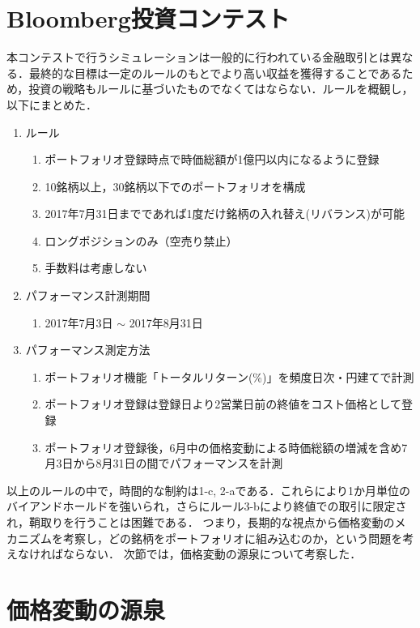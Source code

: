 ﻿\documentclass[11pt]{jreport}
\begin{document}
\section{Bloomberg投資コンテスト}
本コンテストで行うシミュレーションは一般的に行われている金融取引とは異なる．最終的な目標は一定のルールのもとでより高い収益を獲得することであるため，投資の戦略もルールに基づいたものでなくてはならない．ルールを概観し，以下にまとめた．

\begin{enumerate}
\item ルール
\begin{enumerate}
\item ポートフォリオ登録時点で時価総額が1億円以内になるように登録
\item 10銘柄以上，30銘柄以下でのポートフォリオを構成
\item 2017年7月31日までであれば1度だけ銘柄の入れ替え(リバランス)が可能
\item ロングポジションのみ（空売り禁止）
\item 手数料は考慮しない
\end{enumerate}

\item パフォーマンス計測期間
\begin{enumerate}
\item  2017年7月3日 $\sim$ 2017年8月31日
\end{enumerate}

\item パフォーマンス測定方法
\begin{enumerate}
\item ポートフォリオ機能「トータルリターン(\%)」を頻度日次・円建てで計測
\item ポートフォリオ登録は登録日より2営業日前の終値をコスト価格として登録
\item ポートフォリオ登録後，6月中の価格変動による時価総額の増減を含め7月3日から8月31日の間でパフォーマンスを計測
\end{enumerate}
\end{enumerate}

以上のルールの中で，時間的な制約は1-c, 2-aである．これらにより1か月単位のバイアンドホールドを強いられ，さらにルール3-bにより終値での取引に限定され，鞘取りを行うことは困難である．
つまり，長期的な視点から価格変動のメカニズムを考察し，どの銘柄をポートフォリオに組み込むのか，という問題を考えなければならない．
次節では，価格変動の源泉について考察した．

\section{価格変動の源泉}
\end{document}
